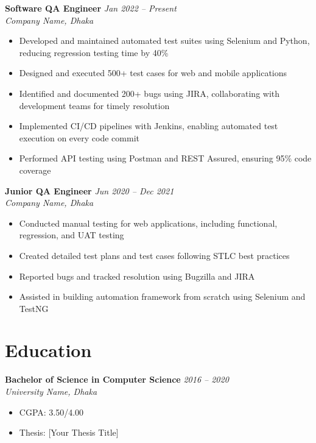 \documentclass[11pt,a4paper]{article}
\begin{document}
\textbf{Software QA Engineer} \hfill \textit{Jan 2022 -- Present}\\
\textit{Company Name, Dhaka}
\begin{itemize}[leftmargin=*, nosep]
    \item Developed and maintained automated test suites using Selenium and Python, reducing regression testing time by 40\%
    \item Designed and executed 500+ test cases for web and mobile applications
    \item Identified and documented 200+ bugs using JIRA, collaborating with development teams for timely resolution
    \item Implemented CI/CD pipelines with Jenkins, enabling automated test execution on every code commit
    \item Performed API testing using Postman and REST Assured, ensuring 95\% code coverage
\end{itemize}

\vspace{6pt}

\textbf{Junior QA Engineer} \hfill \textit{Jun 2020 -- Dec 2021}\\
\textit{Company Name, Dhaka}
\begin{itemize}[leftmargin=*, nosep]
    \item Conducted manual testing for web applications, including functional, regression, and UAT testing
    \item Created detailed test plans and test cases following STLC best practices
    \item Reported bugs and tracked resolution using Bugzilla and JIRA
    \item Assisted in building automation framework from scratch using Selenium and TestNG
\end{itemize}

\section{Education}

\textbf{Bachelor of Science in Computer Science} \hfill \textit{2016 -- 2020}\\
\textit{University Name, Dhaka}
\begin{itemize}[leftmargin=*, nosep]
    \item CGPA: 3.50/4.00
    \item Thesis: [Your Thesis Title]
\end{itemize}
\end{document}
